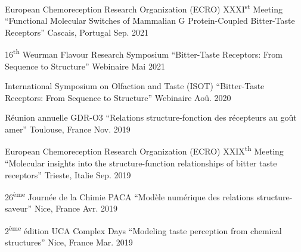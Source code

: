 
\begin{cvhonors}

    \cvhonor
    {European Chemoreception Research Organization (ECRO) \textsc{XXXI}\textsuperscript{st} Meeting}
    {``Functional Molecular Switches of Mammalian G Protein-Coupled Bitter-Taste Receptors''}
    {Cascais, Portugal}
    {Sep. 2021}

    \cvhonor
    {16\textsuperscript{th} Weurman Flavour Research Symposium}
    {``Bitter-Taste Receptors: From Sequence to Structure''}
    {Webinaire}
    {Mai 2021}

    \cvhonor
    {International Symposium on Olfaction and Taste (ISOT)}
    {``Bitter-Taste Receptors: From Sequence to Structure''}
    {Webinaire}
    {Aoû. 2020}

    \cvhonor
    {Réunion annuelle GDR-O3}
    {``Relations structure-fonction des récepteurs au goût amer''}
    {Toulouse, France}
    {Nov. 2019}

    \cvhonor
    {European Chemoreception Research Organization (ECRO) \textsc{XXIX}\textsuperscript{th} Meeting}
    {``Molecular insights into the structure-function relationships of bitter taste receptors''}
    {Trieste, Italie}
    {Sep. 2019}

    \cvhonor
    {26\textsuperscript{ème} Journée de la Chimie PACA}
    {``Modèle numérique des relations structure-saveur''}
    {Nice, France}
    {Avr. 2019}

    \cvhonor
    {2\textsuperscript{ème} édition UCA Complex Days}
    {``Modeling taste perception from chemical structures''}
    {Nice, France}
    {Mar. 2019}

\end{cvhonors}
